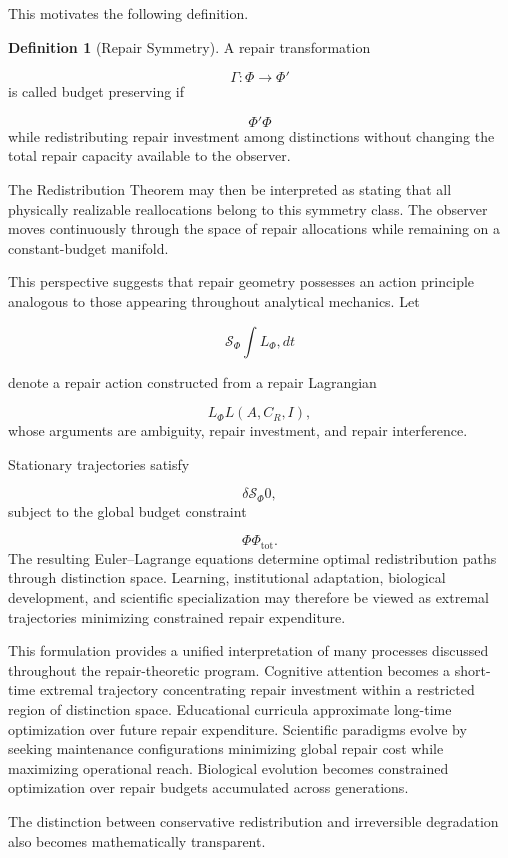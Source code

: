 \documentclass[12pt,oneside]{article}
\theoremstyle{plain}
\theoremstyle{definition}
\newtheorem{definition}[theorem]{Definition}
\theoremstyle{remark}
\begin{document}
This motivates the following definition.

\begin{definition}[Repair Symmetry]
A repair transformation

\[
\Gamma:
\Phi
\rightarrow
\Phi'
\]
is called budget preserving if

\[
\Phi'
\Phi
\]
while redistributing repair investment among distinctions without changing the total repair capacity available to the observer.
\end{definition}

The Redistribution Theorem may then be interpreted as stating that all physically realizable reallocations belong to this symmetry class. The observer moves continuously through the space of repair allocations while remaining on a constant-budget manifold.

This perspective suggests that repair geometry possesses an action principle analogous to those appearing throughout analytical mechanics. Let

\[
\mathcal{S}_{\Phi}
\int
L_{\Phi}
,dt
\]

denote a repair action constructed from a repair Lagrangian

\[
L_{\Phi}
L(A,C_R,I),
\]
whose arguments are ambiguity, repair investment, and repair interference.

Stationary trajectories satisfy

\[
\delta
\mathcal{S}_{\Phi}
0,
\]
subject to the global budget constraint

\[
\Phi
\Phi_{\mathrm{tot}}.
\]
The resulting Euler--Lagrange equations determine optimal redistribution paths through distinction space. Learning, institutional adaptation, biological development, and scientific specialization may therefore be viewed as extremal trajectories minimizing constrained repair expenditure.

This formulation provides a unified interpretation of many processes discussed throughout the repair-theoretic program. Cognitive attention becomes a short-time extremal trajectory concentrating repair investment within a restricted region of distinction space. Educational curricula approximate long-time optimization over future repair expenditure. Scientific paradigms evolve by seeking maintenance configurations minimizing global repair cost while maximizing operational reach. Biological evolution becomes constrained optimization over repair budgets accumulated across generations.

The distinction between conservative redistribution and irreversible degradation also becomes mathematically transparent.
\end{document}
